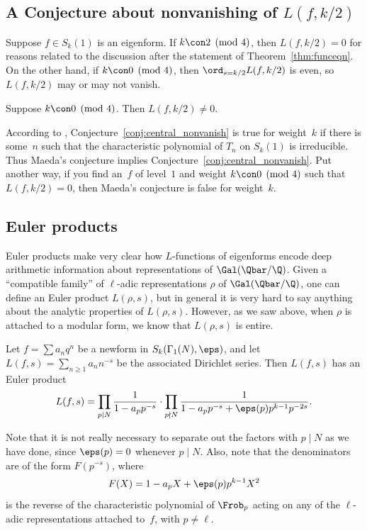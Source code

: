 \documentclass{report}
\begin{document}
\subsection{A Conjecture about nonvanishing of $L(f,k/2)$}
Suppose $f\in S_k(1)$ is an eigenform.  If $k\con 2\pmod{4}$, then
$L(f,k/2)=0$ for reasons related to the discussion after the statement
of Theorem~\ref{thm:funceqn}.  On the other hand, if $k\con
0\pmod{4}$, then $\ord_{s=k/2}L(f,k/2)$ is even, so $L(f,k/2)$ may
or may not vanish.
\begin{conjecture}\label{conj:central_nonvanish}
Suppose $k\con 0\pmod{4}$.  Then $L(f,k/2)\neq 0$.
\end{conjecture}
According to \cite{conrey-farmer:nonvanish},
Conjecture~\ref{conj:central_nonvanish} is true for weight~$k$ if
there is some~$n$ such that the characteristic polynomial of $T_n$ on
$S_k(1)$ is irreducible.  Thus Maeda's conjecture implies
Conjecture~\ref{conj:central_nonvanish}.  Put another way, if you find
an~$f$ of level~$1$ and weight $k\con 0\pmod{4}$ such that
$L(f,k/2)=0$, then Maeda's conjecture is false for weight~$k$.


\subsection{Euler products}
Euler products make very clear how $L$-functions of eigenforms encode
deep arithmetic information about representations of $\Gal(\Qbar/\Q)$.
Given a ``compatible family'' of $\ell$-adic representations $\rho$ of
$\Gal(\Qbar/\Q)$, one can define an Euler product $L(\rho,s)$, but in
general it is very hard to say anything about the analytic properties
of $L(\rho,s)$.   However, as we saw above, when $\rho$ is attached
to a modular form, we know that $L(\rho,s)$ is entire.

\begin{theorem}\label{thm:eulerprod}
  Let $f = \sum a_n q^n$ be a newform in $S_k(\Gamma_1(N),\eps)$, and
  let $L(f,s) = \sum_{n\geq 1} a_n n^{-s}$ be the associated Dirichlet
  series.  Then $L(f,s)$ has an Euler product
$$
  L(f,s) = \prod_{p\mid N} \frac{1}{1 - a_p p^{-s}}\cdot
  \prod_{p\nmid N}\frac{1}{1-a_p p^{-s} + \eps(p) p^{k-1}p^{-2s}}.
$$
\end{theorem}
Note that it is not really necessary to separate out the factors with
$p\mid N$ as we have done, since $\eps(p)=0$ whenever $p\mid N$.
Also, note that the denominators are of the form $F(p^{-s})$, where
$$
  F(X)=1-a_p X + \eps(p) p^{k-1}X^2
$$
is the reverse of the characteristic polynomial of
$\Frob_p$ acting on any of the $\ell$-adic representations
attached to~$f$, with $p\neq \ell$.
\end{document}
